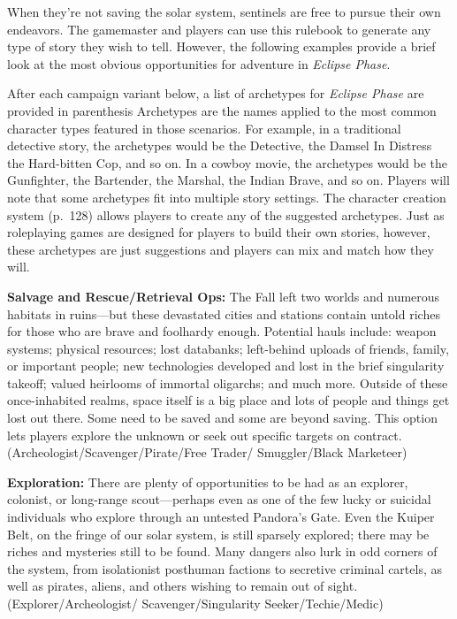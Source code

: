 When they're not saving the solar system, sentinels are 
free to pursue their own endeavors. The gamemaster 
and players can use this rulebook to generate any 
type of story they wish to tell. However, the following 
examples provide a brief look at the most obvious opportunities
for adventure in \textit{Eclipse Phase}.

After each campaign variant below, a list of archetypes
for \textit{Eclipse Phase} are provided in parenthesis
Archetypes are the names applied to the most
common character types featured in those scenarios. 
For example, in a traditional detective story, the archetypes
would be the Detective, the Damsel In Distress
the Hard-bitten Cop, and so on. In a cowboy
movie, the archetypes would be the Gunfighter, the 
Bartender, the Marshal, the Indian Brave, and so 
on. Players will note that some archetypes fit into 
multiple story settings. The character creation system 
(p. 128) allows players to create any of the suggested 
archetypes. Just as roleplaying games are designed 
for players to build their own stories, however, these 
archetypes are just suggestions and players can mix 
and match how they will.

\textbf{Salvage and Rescue/Retrieval Ops:} The Fall left 
two worlds and numerous habitats in ruins—but 
these devastated cities and stations contain untold 
riches for those who are brave and foolhardy 
enough. Potential hauls include: weapon systems; 
physical resources; lost databanks; left-behind uploads
of friends, family, or important people; new
technologies developed and lost in the brief singularity
takeoff; valued heirlooms of immortal oligarchs;
and much more. Outside of these once-inhabited 
realms, space itself is a big place and lots of people 
and things get lost out there. Some need to be saved 
and some are beyond saving. This option lets players 
explore the unknown or seek out specific targets on 
contract. (Archeologist/Scavenger/Pirate/Free Trader/
Smuggler/Black Marketeer)

\textbf{Exploration:} There are plenty of opportunities 
to be had as an explorer, colonist, or long-range 
scout—perhaps even as one of the few lucky or suicidal
individuals who explore through an untested
Pandora's Gate. Even the Kuiper Belt, on the fringe 
of our solar system, is still sparsely explored; there 
may be riches and mysteries still to be found. Many 
dangers also lurk in odd corners of the system, from 
isolationist posthuman factions to secretive criminal 
cartels, as well as pirates, aliens, and others wishing
to remain out of sight. (Explorer/Archeologist/
Scavenger/Singularity Seeker/Techie/Medic)

